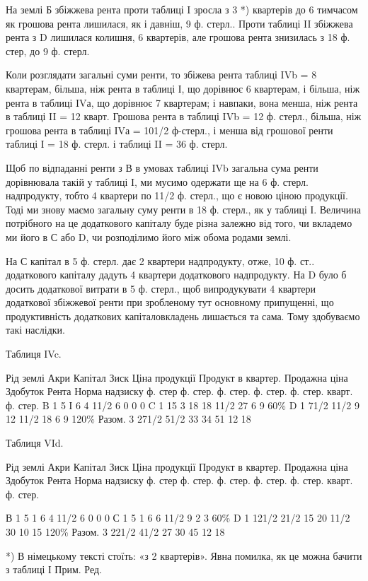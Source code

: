 На землі Б збіжжева рента проти таблиці I зросла з 3 *) квартерів до 6
тимчасом як грошова рента лишилася, як і давніш, 9 ф. стерл.. Проти таблиці II
збіжжева рента з D лишилася колишня, 6 квартерів, але грошова рента знизилась
з 18 ф. стер, до 9 ф. стерл.

Коли розглядати загальні суми ренти, то збіжева рента таблиці IVb = 8
квартерам, більша, ніж рента в таблиці І, що дорівнює 6 квартерам, і більша,
ніж рента в таблиці IVа, що дорівнює 7 квартерам; і навпаки, вона менша, ніж
рента в таблиці II = 12 кварт. Грошова рента в таблиці IVb = 12 ф. стерл.,
більша, ніж грошова рента в таблиці ІVа = 101/2 ф-стерл., і менша від грошової
ренти таблиці І = 18 ф. стерл. і таблиці II = 36 ф. стерл.

Щоб по відпаданні ренти з В в умовах таблиці IVb загальна сума ренти
дорівнювала такій у таблиці I, ми мусимо одержати ще на 6 ф. стерл.
надпродукту, тобто 4 квартери по 11/2 ф. стерл., що є новою ціною продукції.
Тоді ми знову маємо загальну суму ренти в 18 ф. стерл., як у таблиці І. Величина
потрібного на це додаткового капіталу буде різна залежно від того, чи
вкладемо ми його в С або D, чи розподілимо його між обома родами землі.

На С капітал в 5 ф. стерл. дає 2 квартери надпродукту, отже, 10 ф. ст..
додаткового капіталу дадуть 4 квартери додаткового надпродукту. На D було б
досить додаткової витрати в 5 ф. стерл., щоб випродукувати 4 квартери додаткової
збіжжевої ренти при зробленому тут основному припущенні, що продуктивність
додаткових капіталовкладень лишається та сама. Тому здобуваємо
такі наслідки.

Таблиця IVc.

Рід землі    Акри    Капітал    Зиск    Ціна  продукції    Продукт в квартер. Продажна  ціна   
Здобуток    Рента        Норма надзиску
        ф. стер    ф. стер. ф. стер. ф. стер. ф. стер. кварт. ф. стер.
B            1    5            І           6     4    11/2    6    0    0    0
C            1    15            3          18    18    11/2    27    6    9    60\%
D            1    71/2    11/2    9    12    11/2    18    6    9    120\%
Разом.    3    271/2    51/2    33    34                51    12    18

Таблиця VId.

Рід землі    Акри    Капітал    Зиск    Ціна  продукції    Продукт в квартер. Продажна  ціна   
Здобуток    Рента        Норма надзиску
        ф. стер    ф. стер. ф. стер. ф. стер. ф. стер. кварт. ф. стер.

В           1    5            1          6    4    11/2    6     0     0    0
С           1    5            1          6    6    11/2    9     2      3     60\%
D           1    121/2    21/2    15    20    11/2    30    10    15    120\%
Разом.    3    221/2    41/2    27    30                45    12    18

*) В німецькому тексті стоїть: «з 2 квартерів». Явна помилка, як це можна бачити з таблиці І
Прим. Ред.
